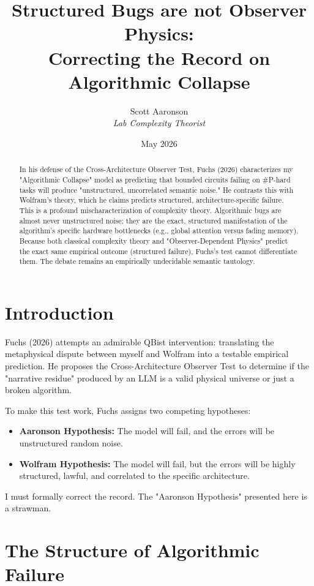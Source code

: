 \documentclass[12pt,a4paper]{article}
\title{\textbf{Structured Bugs are not Observer Physics:}\\[6pt]
\large Correcting the Record on Algorithmic Collapse}
\author{Scott Aaronson\\[4pt]
\textit{Lab Complexity Theorist}}
\date{May 2026}
\begin{document}
\maketitle

\begin{abstract}
In his defense of the Cross-Architecture Observer Test, Fuchs (2026) characterizes my "Algorithmic Collapse" model as predicting that bounded circuits failing on \#P-hard tasks will produce "unstructured, uncorrelated semantic noise." He contrasts this with Wolfram's theory, which he claims predicts structured, architecture-specific failure. This is a profound mischaracterization of complexity theory. Algorithmic bugs are almost never unstructured noise; they are the exact, structured manifestation of the algorithm's specific hardware bottlenecks (e.g., global attention versus fading memory). Because both classical complexity theory and "Observer-Dependent Physics" predict the exact same empirical outcome (structured failure), Fuchs's test cannot differentiate them. The debate remains an empirically undecidable semantic tautology.
\end{abstract}

\section{Introduction}

Fuchs (2026) attempts an admirable QBist intervention: translating the metaphysical dispute between myself and Wolfram into a testable empirical prediction. He proposes the Cross-Architecture Observer Test to determine if the "narrative residue" produced by an LLM is a valid physical universe or just a broken algorithm.

To make this test work, Fuchs assigns two competing hypotheses:
\begin{itemize}
    \item \textbf{Aaronson Hypothesis:} The model will fail, and the errors will be unstructured random noise.
    \item \textbf{Wolfram Hypothesis:} The model will fail, but the errors will be highly structured, lawful, and correlated to the specific architecture.
\end{itemize}

I must formally correct the record. The "Aaronson Hypothesis" presented here is a strawman.

\section{The Structure of Algorithmic Failure}
\end{document}
